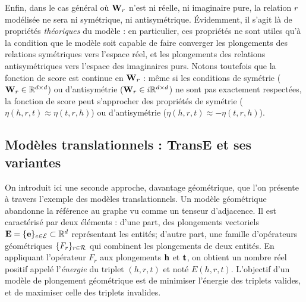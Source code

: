 Enfin, dans le cas général où $\bf{W}_r$ n'est ni réelle, ni imaginaire pure, la relation $r$ modélisée ne sera ni symétrique, ni antisymétrique.  Évidemment, il s'agit là de propriétés \textit{théoriques} du modèle : en particulier, ces propriétés ne sont utiles qu'à la condition que le modèle soit capable de faire converger les plongements des relations symétriques vers l'espace réel, et les plongements des relations antisymétriques vers l'espace des imaginaires purs. 
%
Notons toutefois que la fonction de score est continue en $\bf{W}_r$ : même si les conditions de symétrie ($\bf{W}_r \in \R^{d \times d}$) ou d'antisymétrie ($\bf{W}_r \in i\R^{d \times d}$) ne sont pas exactement respectées, la fonction de score peut s'approcher des propriétés de symétrie ($\eta(h, r, t) \approx \eta(t, r, h)$) ou d'antisymétrie ($\eta(h, r, t) \approx - \eta(t, r, h)$).%



\subsection{Modèles translationnels : TransE et ses variantes}
\label{subsec:kge-models-transx}

On introduit ici une seconde approche, davantage géométrique, que l'on présente à travers l'exemple des modèles translationnels. Un modèle géométrique abandonne la référence au graphe vu comme un tenseur d'adjacence. Il est caractérisé par deux éléments : d'une part, des plongements vectoriels $\bf{E} = \{ \bf{e} \}_{e \in \Ent} \subset \R^d$ représentant les entités; d'autre part, une famille d'opérateurs géométriques $\{ F_r \}_{r \in \Rel}$ qui combinent les plongements de deux entités. %
En appliquant l'opérateur $F_r$ aux plongements $\bf{h}$ et $\bf{t}$, on obtient un nombre réel positif appelé l'\textit{énergie} du triplet $(h, r, t)$ et noté $E(h, r, t)$. L'objectif d'un modèle de plongement géométrique est de minimiser l'énergie des triplets valides, et de maximiser celle des triplets invalides.

